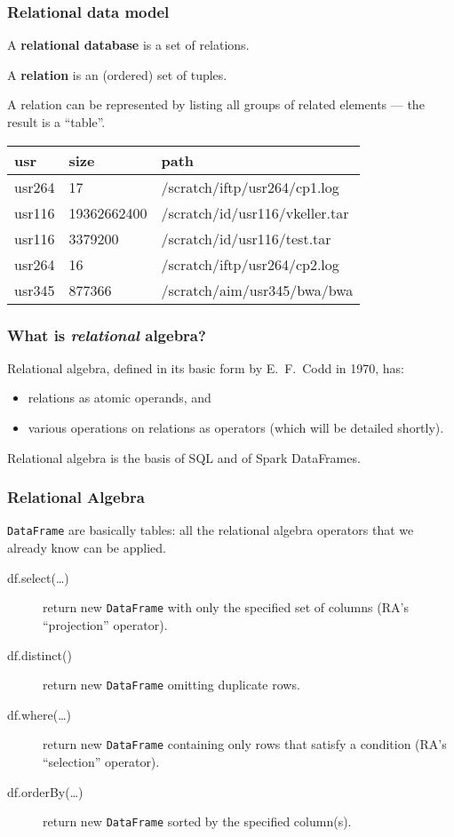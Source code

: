\documentclass[english,serif,mathserif]{beamer}
\begin{document}
\begin{frame}[fragile]
  \frametitle{Relational data  model}

  \normalsize
  A \textbf{relational database} is a set of relations.

  \+
  A \textbf{relation} is an (ordered) set of tuples.

  \+
  A relation can be represented by listing all groups of related elements
  --- the result is a ``table''.

  \+
  \small
  \begin{center}
    \begin{tabular}{lll}
      \textbf{usr}
             & \textbf{size}
                           & \textbf{path}                  \\
      \hline
      usr264 &          17 & /scratch/iftp/usr264/cp1.log   \\
      usr116 & 19362662400 & /scratch/id/usr116/vkeller.tar \\
      usr116 &     3379200 & /scratch/id/usr116/test.tar    \\
      usr264 &          16 & /scratch/iftp/usr264/cp2.log   \\
      usr345 &      877366 & /scratch/aim/usr345/bwa/bwa    \\
    \end{tabular}
  \end{center}
\end{frame}


\begin{frame}
  \frametitle{What is \emph{relational} algebra?}

  Relational algebra, defined in its basic form by E.~F.~Codd in 1970, has:
  \begin{itemize}
  \item relations as atomic operands, and
  \item various operations on relations as operators (which will be detailed shortly).
  \end{itemize}

  \+
  Relational algebra is the basis of SQL and of Spark DataFrames.
\end{frame}


\begin{frame}
  \frametitle{Relational Algebra}
  \texttt{DataFrame} are basically tables: all the relational algebra operators
  that we already know can be applied.

  \+
  \begin{description}
  \item[df.select(\ldots)] return new \texttt{DataFrame} with only the
    specified set of columns (RA's ``projection'' operator).
  \item[df.distinct()] return new \texttt{DataFrame} omitting duplicate rows.
  \item[df.where(\ldots)] return new \texttt{DataFrame} containing only rows
    that satisfy a condition (RA's ``selection'' operator).
  \item[df.orderBy(\ldots)] return new \texttt{DataFrame} sorted by the specified column(s).
  \end{description}
\end{frame}
\end{document}
